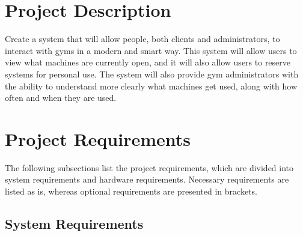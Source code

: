 \documentclass[letterpaper,11pt]{./templates/texMemo} %
\begin{document}
\section{Project Description}

Create a system that will allow people, both clients and administrators, to interact with gyms in a modern and smart way. This system will allow users to view what machines are currently open, and it will also allow users to reserve systems for personal use. The system will also provide gym administrators with the ability to understand more clearly what machines get used, along with how often and when they are used.

\section{Project Requirements}

The following subsections list the project requirements, which are divided into system requirements and hardware requirements. Necessary requirements are listed as is, whereas optional requirements are presented in brackets.

\subsection{System Requirements}
\end{document}
